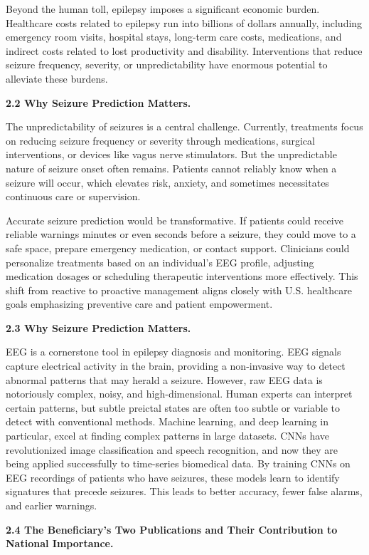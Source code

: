 \documentclass{article}
\begin{document}
Beyond the human toll, epilepsy imposes a significant economic burden. Healthcare costs related to epilepsy run into billions of dollars annually, including emergency room visits, hospital stays, long-term care costs, medications, and indirect costs related to lost productivity and disability. Interventions that reduce seizure frequency, severity, or unpredictability have enormous potential to alleviate these burdens.


{\bf 2.2 Why Seizure Prediction Matters. }

The unpredictability of seizures is a central challenge. Currently, treatments focus on reducing seizure frequency or severity through medications, surgical interventions, or devices like vagus nerve stimulators. But the unpredictable nature of seizure onset often remains. Patients cannot reliably know when a seizure will occur, which elevates risk, anxiety, and sometimes necessitates continuous care or supervision.

Accurate seizure prediction would be transformative. If patients could receive reliable warnings minutes or even seconds before a seizure, they could move to a safe space, prepare emergency medication, or contact support. Clinicians could personalize treatments based on an individual’s EEG profile, adjusting medication dosages or scheduling therapeutic interventions more effectively. This shift from reactive to proactive management aligns closely with U.S. healthcare goals emphasizing preventive care and patient empowerment.

{\bf 2.3 Why Seizure Prediction Matters. }

EEG is a cornerstone tool in epilepsy diagnosis and monitoring. EEG signals capture electrical activity in the brain, providing a non-invasive way to detect abnormal patterns that may herald a seizure. However, raw EEG data is notoriously complex, noisy, and high-dimensional. Human experts can interpret certain patterns, but subtle preictal states are often too subtle or variable to detect with conventional methods.
Machine learning, and deep learning in particular, excel at finding complex patterns in large datasets. CNNs have revolutionized image classification and speech recognition, and now they are being applied successfully to time-series biomedical data. By training CNNs on EEG recordings of patients who have seizures, these models learn to identify signatures that precede seizures. This leads to better accuracy, fewer false alarms, and earlier warnings.

{\bf 2.4 The Beneficiary’s Two Publications and Their Contribution to National Importance. }
\end{document}

